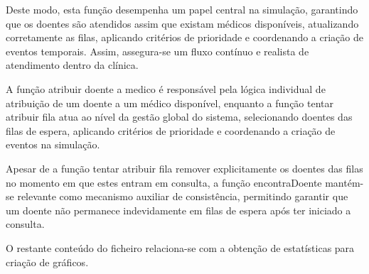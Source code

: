 \documentclass[12pt,a4paper]{article} %
\begin{document}
    
    Deste modo, esta função desempenha um papel central na simulação, garantindo que os doentes são atendidos assim que existam médicos disponíveis, atualizando corretamente as filas, aplicando critérios de prioridade e coordenando a criação de eventos temporais. Assim, assegura-se um fluxo contínuo e realista de atendimento dentro da clínica.
    
    A função atribuir doente a medico é responsável pela lógica individual de atribuição de um doente a um médico disponível, enquanto a função tentar atribuir fila atua ao nível da gestão global do sistema, selecionando doentes das filas de espera, aplicando critérios de prioridade e coordenando a criação de eventos na simulação.

    Apesar de a função tentar atribuir fila remover explicitamente os doentes das filas no momento em que estes entram em consulta, a função encontraDoente mantém-se relevante como mecanismo auxiliar de consistência, permitindo garantir que um doente não permanece indevidamente em filas de espera após ter iniciado a consulta.

    \medskip
    O restante conteúdo do ficheiro relaciona-se com a obtenção de estatísticas para criação de gráficos. 
\end{document}
